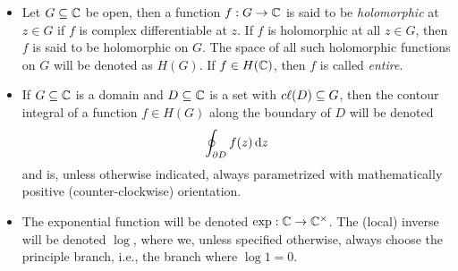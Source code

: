 \begin{itemize}[label=$\rightsquigarrow$]
    \item Let $G \subseteq \mathbb{C}$ be open, then a function $f : G \to \mathbb{C}$ is said to be \emph{holomorphic} at $z \in G$ if $f$ is complex differentiable at $z$. If $f$ is holomorphic at all $z \in G$, then $f$ is said to be holomorphic on $G$. The space of all such holomorphic functions on $G$ will be denoted as $H(G)$. If $f \in H(\mathbb{C})$, then $f$ is called \emph{entire}.
    \item If $G \subseteq \mathbb{C}$ is a domain and $D \subseteq \mathbb{C}$ is a set with $c\ell({D}) \subseteq G$, then the contour integral of a function $f \in H(G)$ along the boundary of $D$ will be denoted
    $$ \oint_{\partial D} f(z) \mathop{}\!\mathrm{d} z $$
    and is, unless otherwise indicated, always parametrized with mathematically positive (counter-clockwise) orientation. 
    \item The exponential function will be denoted $\exp : \mathbb{C} \to \mathbb{C}^\times$. The (local) inverse will be denoted $\log$, where we, unless specified otherwise, always choose the principle branch, i.e., the branch where $\log 1 = 0$.
\end{itemize}
